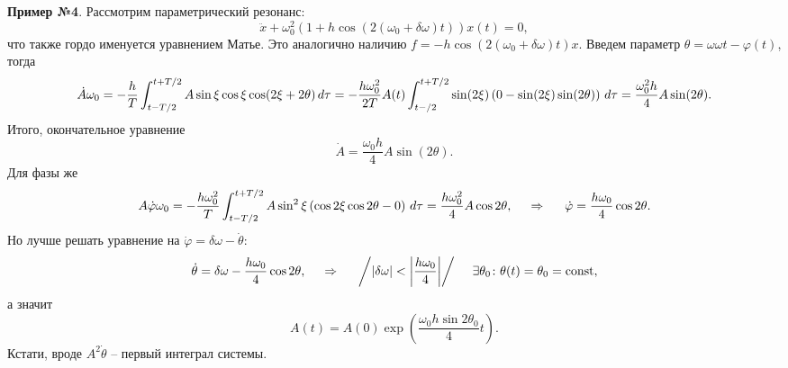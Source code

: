 \textbf{Пример №4}. Рассмотрим параметрический резонанс:
\begin{equation*}
    \ddot{x} + \omega_0^2 \left(1 + h \cos\left(2(\omega_0 + \delta \omega) t\right)\right) x(t) = 0,
\end{equation*}
что также гордо именуется уравнением Матье. Это аналогично наличию $f = - h \cos(2 (\omega_0 +\delta \omega) t) x$.  Введем параметр $\theta = \omega \omega t - \varphi(t)$, тогда
\begin{equation*}
    \dot{A} \omega_0 = - \frac{h}{T} \int_{t-T/2}^{t+T/2} A \sin \xi \cos \xi \cos(2 \xi + 2 \theta) \, d \tau = - \frac{h \omega_0^2}{2T} A(t) \int_{t-/2}^{t+T/2} \sin(2 \xi) \left(
        0 - \sin(2 \xi) \sin(2 \theta)
    \right) \, d \tau = \frac{\omega_0^2 h}{4}A \sin(2 \theta).
\end{equation*}
Итого, окончательное уравнение
\begin{equation*}
    \dot{A} = \frac{\omega_0 h}{4} A \sin(2 \theta).
\end{equation*}
Для фазы же
\begin{equation*}
    A \dot{\varphi} \omega_0  = - \frac{h \omega_0^2}{T} \int_{t-T/2}^{t+T/2} A \sin^2 \xi \left(
        \cos 2 \xi \cos 2 \theta - 0
    \right) \, d \tau = \frac{h \omega_0^2}{4} A \cos 2 \theta,
    \hspace{0.5cm} \Rightarrow \hspace{0.5cm}
    \dot{\varphi} = \frac{h \omega_0}{4} \cos 2 \theta.
\end{equation*}
Но лучше решать уравнение на $\dot{\varphi} = \delta \omega - \dot{\theta}$:
\begin{equation*}
    \dot{\theta} = \delta \omega - \frac{h \omega_0}{4} \cos 2 \theta,
    \hspace{0.5cm} \Rightarrow \hspace{0.5cm}
    \bigg/ |\delta \omega| < \bigg| \frac{h \omega_0}{4} \bigg| \bigg/
    \hspace{5 mm} 
    \exists \theta_0 \colon  \theta(t) = \theta_0 = \textnormal{const},
\end{equation*}
а значит
\begin{equation*}
    A(t) = A(0) \exp\left(
        \frac{\omega_0 h \sin 2 \theta_0}{4} t
    \right).
\end{equation*}
Кстати, вроде $A^2 \dot{\theta}$ -- первый интеграл системы.


